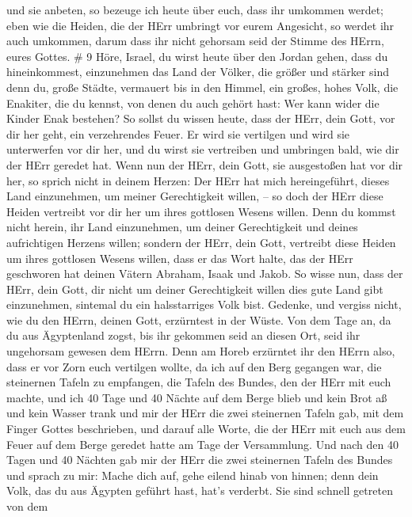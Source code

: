 und sie anbeten, so bezeuge ich heute über euch, dass ihr umkommen
werdet;  eben wie die Heiden, die der HErr umbringt vor
eurem Angesicht, so werdet ihr auch umkommen, darum dass ihr nicht
gehorsam seid der Stimme des HErrn, eures Gottes. \# 9 
Höre, Israel, du wirst heute über den Jordan gehen, dass du
hineinkommest, einzunehmen das Land der Völker, die größer und stärker
sind denn du, große Städte, vermauert bis in den Himmel, 
ein großes, hohes Volk, die Enakiter, die du kennst, von denen du auch
gehört hast: Wer kann wider die Kinder Enak bestehen?  So
sollst du wissen heute, dass der HErr, dein Gott, vor dir her geht, ein
verzehrendes Feuer. Er wird sie vertilgen und wird sie unterwerfen vor
dir her, und du wirst sie vertreiben und umbringen bald, wie dir der
HErr geredet hat.  Wenn nun der HErr, dein Gott, sie
ausgestoßen hat vor dir her, so sprich nicht in deinem Herzen: Der HErr
hat mich hereingeführt, dieses Land einzunehmen, um meiner Gerechtigkeit
willen, -- so doch der HErr diese Heiden vertreibt vor dir her um ihres
gottlosen Wesens willen.  Denn du kommst nicht herein, ihr
Land einzunehmen, um deiner Gerechtigkeit und deines aufrichtigen
Herzens willen; sondern der HErr, dein Gott, vertreibt diese Heiden um
ihres gottlosen Wesens willen, dass er das Wort halte, das der HErr
geschworen hat deinen Vätern Abraham, Isaak und Jakob.  So
wisse nun, dass der HErr, dein Gott, dir nicht um deiner Gerechtigkeit
willen dies gute Land gibt einzunehmen, sintemal du ein halsstarriges
Volk bist.  Gedenke, und vergiss nicht, wie du den HErrn,
deinen Gott, erzürntest in der Wüste. Von dem Tage an, da du aus
Ägyptenland zogst, bis ihr gekommen seid an diesen Ort, seid ihr
ungehorsam gewesen dem HErrn.  Denn am Horeb erzürntet ihr
den HErrn also, dass er vor Zorn euch vertilgen wollte,  da
ich auf den Berg gegangen war, die steinernen Tafeln zu empfangen, die
Tafeln des Bundes, den der HErr mit euch machte, und ich 40 Tage und 40
Nächte auf dem Berge blieb und kein Brot aß und kein Wasser trank
 und mir der HErr die zwei steinernen Tafeln gab, mit dem
Finger Gottes beschrieben, und darauf alle Worte, die der HErr mit euch
aus dem Feuer auf dem Berge geredet hatte am Tage der Versammlung.
 Und nach den 40 Tagen und 40 Nächten gab mir der HErr die
zwei steinernen Tafeln des Bundes  und sprach zu mir: Mache
dich auf, gehe eilend hinab von hinnen; denn dein Volk, das du aus
Ägypten geführt hast, hat's verderbt. Sie sind schnell getreten von dem
